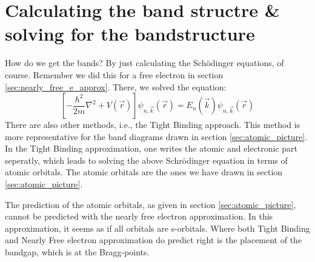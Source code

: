 \section{Calculating the band structre & solving for the bandstructure}
How do we get the bands? By just calculating the Schödinger equations, of course. Remember we did this for a free electron in section \ref{sec:nearly_free_e_approx}. There, we solved the equation:
\begin{equation}
	\left[-\frac{\hbar^2}{2m}\nabla^2 + V(\vec{r})\right]\psi_{n, \vec{k}}(\vec{r}) = E_n(\vec{k})\psi_{n, \vec{k}}(\vec{r})
\end{equation}
There are also other methods, i.e., the Tight Binding approach. This method is more representative for the band diagrams drawn in section \ref{sec:atomic_picture}. In the Tight Binding approximation, one writes the atomic and electronic part seperatly, which leads to solving the above Schrödinger equation in terms of atomic orbitals. The atomic orbitals are the ones we have drawn in section \ref{sec:atomic_picture}.\par
The prediction of the atomic orbitals, as given in section \ref{sec:atomic_picture}, cannot be predicted with the nearly free electron approximation. In this approximation, it seems as if all orbitals are s-orbitals. Where both Tight Binding and Nearly Free electron approximation do predict right is the placement of the bandgap, which is at the Bragg-points.
